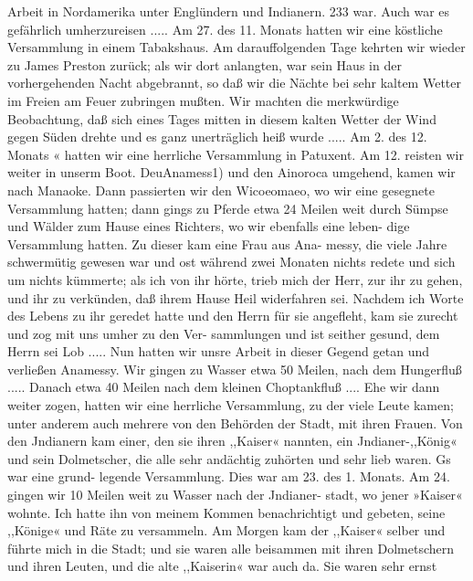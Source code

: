 Arbeit in Nordamerika unter Englündern und Indianern. 233
war. Auch war es gefährlich umherzureisen ..... Am 27. des
11. Monats hatten wir eine köstliche Versammlung in einem
Tabakshaus. Am darauffolgenden Tage kehrten wir wieder zu
James Preston zurück; als wir dort anlangten, war sein Haus
in der vorhergehenden Nacht abgebrannt, so daß wir die Nächte
bei sehr kaltem Wetter im Freien am Feuer zubringen mußten.
Wir machten die merkwürdige Beobachtung, daß sich eines Tages
mitten in diesem kalten Wetter der Wind gegen Süden drehte
und es ganz unerträglich heiß wurde ..... Am 2. des 12. Monats «
hatten wir eine herrliche Versammlung in Patuxent. Am 12.
reisten wir weiter in unserm Boot. DeuAnamess1) und den
Ainoroca umgehend, kamen wir nach Manaoke. Dann passierten
wir den Wicoeomaeo, wo wir eine gesegnete Versammlung hatten;
dann gings zu Pferde etwa 24 Meilen weit durch Sümpse und
Wälder zum Hause eines Richters, wo wir ebenfalls eine leben-
dige Versammlung hatten. Zu dieser kam eine Frau aus Ana-
messy, die viele Jahre schwermütig gewesen war und ost während
zwei Monaten nichts redete und sich um nichts kümmerte; als ich
von ihr hörte, trieb mich der Herr, zur ihr zu gehen, und ihr zu
verkünden, daß ihrem Hause Heil widerfahren sei. Nachdem ich
Worte des Lebens zu ihr geredet hatte und den Herrn für sie
angefleht, kam sie zurecht und zog mit uns umher zu den Ver-
sammlungen und ist seither gesund, dem Herrn sei Lob .....
Nun hatten wir unsre Arbeit in dieser Gegend getan und
verließen Anamessy. Wir gingen zu Wasser etwa 50 Meilen,
nach dem Hungerfluß ..... Danach etwa 40 Meilen nach dem
kleinen Choptankfluß .... Ehe wir dann weiter zogen, hatten
wir eine herrliche Versammlung, zu der viele Leute kamen; unter
anderem auch mehrere von den Behörden der Stadt, mit ihren
Frauen. Von den Jndianern kam einer, den sie ihren ,,Kaiser«
nannten, ein Jndianer-,,König« und sein Dolmetscher, die alle sehr
andächtig zuhörten und sehr lieb waren. Gs war eine grund-
legende Versammlung. Dies war am 23. des 1. Monats. Am
24. gingen wir 10 Meilen weit zu Wasser nach der Jndianer-
stadt, wo jener »Kaiser« wohnte. Ich hatte ihn von meinem Kommen
benachrichtigt und gebeten, seine ,,Könige« und Räte zu versammeln.
Am Morgen kam der ,,Kaiser« selber und führte mich in die Stadt;
und sie waren alle beisammen mit ihren Dolmetschern und ihren
Leuten, und die alte ,,Kaiserin« war auch da. Sie waren sehr ernst


